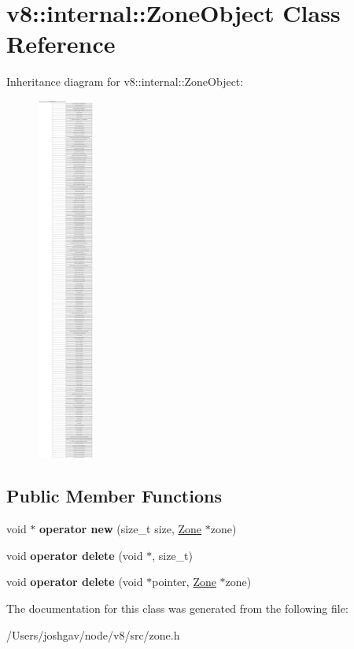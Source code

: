 \hypertarget{classv8_1_1internal_1_1_zone_object}{}\section{v8\+:\+:internal\+:\+:Zone\+Object Class Reference}
\label{classv8_1_1internal_1_1_zone_object}
Inheritance diagram for v8\+:\+:internal\+:\+:Zone\+Object\+:\begin{figure}[H]
\begin{center}
\leavevmode
\includegraphics[height=12.000000cm]{classv8_1_1internal_1_1_zone_object}
\end{center}
\end{figure}
\subsection*{Public Member Functions}
\begin{DoxyCompactItemize}
\item 
void $\ast$ {\bfseries operator new} (size\+\_\+t size, \hyperlink{classv8_1_1internal_1_1_zone}{Zone} $\ast$zone)\hypertarget{classv8_1_1internal_1_1_zone_object_a8ad7c4ba03122924e588baa778296fb7}{}\label{classv8_1_1internal_1_1_zone_object_a8ad7c4ba03122924e588baa778296fb7}

\item 
void {\bfseries operator delete} (void $\ast$, size\+\_\+t)\hypertarget{classv8_1_1internal_1_1_zone_object_a7cdf166da84374e44eb3558851a17a1b}{}\label{classv8_1_1internal_1_1_zone_object_a7cdf166da84374e44eb3558851a17a1b}

\item 
void {\bfseries operator delete} (void $\ast$pointer, \hyperlink{classv8_1_1internal_1_1_zone}{Zone} $\ast$zone)\hypertarget{classv8_1_1internal_1_1_zone_object_a4c1850e80517169980d997db7e81a26b}{}\label{classv8_1_1internal_1_1_zone_object_a4c1850e80517169980d997db7e81a26b}

\end{DoxyCompactItemize}


The documentation for this class was generated from the following file\+:\begin{DoxyCompactItemize}
\item 
/\+Users/joshgav/node/v8/src/zone.\+h\end{DoxyCompactItemize}
